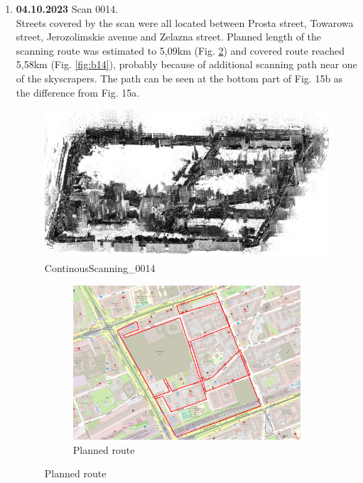 \documentclass[a4paper,12pt]{book}
\begin{document}
\begin{enumerate}
	\item \textbf{04.10.2023} Scan 0014. \\
	Streets covered by the scan were all located between Prosta street, Towarowa street, Jerozolimskie avenue and Zelazna street. Planned length of the scanning route was estimated to 5,09km (Fig. \ref{fig:a14}) and covered route reached 5,58km (Fig. \ref{fig:b14}), probably because of additional scanning path near one of the skyscrapers. The path can be seen at the bottom part of Fig. 15b as the difference from Fig. 15a.
	\begin{figure}[H]
		\includegraphics[width=1\linewidth]{cloud14}
		\caption{ContinousScanning\_0014}
	\end{figure}
	\begin{figure}[H]
		\centering
		\begin{subfigure}{.90\textwidth}
			\centering
			\includegraphics[width=1\linewidth]{route_p14}
			\caption{Planned route}
			\label{fig:a14}
		\end{subfigure}%
		\linebreak

\end{figure}
\end{enumerate}
\end{document}

